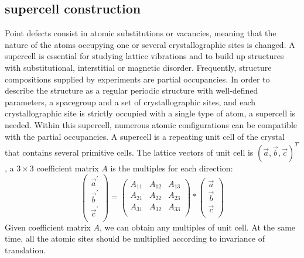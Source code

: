 \documentclass[aps,preprint,amsmath,amssymb]{revtex4}
\begin{document}
\subsection{supercell construction}
Point defects consist in atomic substitutions or vacancies, meaning that the nature of the atoms
occupying one or several crystallographic sites is changed.
A supercell is essential for studying lattice vibrations
and to build up structures with substitutional, interstitial or magnetic disorder. Frequently,
structure compositions supplied by experiments are partial occupancies.
In order to describe the structure as a regular periodic structure with well-defined parameters,
a spacegroup and a set of crystallographic sites, and each crystallographic
site is strictly occupied with a single type of atom, a supercell is needed. Within this supercell,
numerous atomic configurations can be compatible with the partial occupancies.
A supercell is a repeating unit cell of the crystal that contains several primitive cells.
The lattice vectors of unit cell is $(\vec{a},\vec{b},\vec{c})^{T}$,
a $3\times3$ coefficient matrix $A$ is the multiples for each direction:
\begin{equation}\label{supercell}
  \left(
    \begin{array}{c}
      \vec{a}^{'} \\
      \vec{b}^{'} \\
      \vec{c}^{'} \\
    \end{array}
  \right)=\left(
            \begin{array}{ccc}
              A_{11} & A_{12} & A_{13} \\
              A_{21} & A_{22} & A_{23} \\
              A_{31} & A_{32} & A_{33} \\
            \end{array}
          \right)*\left(
                    \begin{array}{c}
                      \vec{a} \\
                      \vec{b} \\
                      \vec{c} \\
                    \end{array}
                  \right)
\end{equation}
Given coefficient matrix $A$, we can obtain any multiples of unit cell.
At the same time, all the atomic sites should be multiplied according to
invariance of translation.
\end{document}
